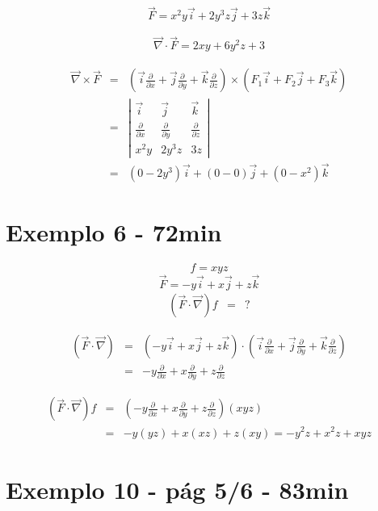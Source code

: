 \documentclass[a4paper,10pt]{article}
\begin{document}
 $$\vec{F}=x^2y\vec{i}+2y^3z\vec{j}+3z\vec{k} $$
 
 \begin{eqnarray*}
  \vec{\nabla}\cdot\vec{F}=2xy+6y^2z+3
 \end{eqnarray*}

  \begin{eqnarray*}
\vec{\nabla}\times\vec{F}&=&\left(\vec{i}\frac{\partial}{\partial x}+\vec{j}\frac{\partial}{\partial y}+\vec{k}\frac{\partial}{\partial z}\right)\times\left(F_1\vec{i}+F_2\vec{j}+F_3\vec{k}\right)\\
&=&\left|
\begin{array}{ccc}
\vec{i}&\vec{j}&\vec{k} \\[.2cm]
\frac{\partial}{\partial x } & \frac{\partial}{\partial y } &\frac{\partial}{\partial z } \\[.2cm]
x^2y&2y^3z&3z
\end{array}
\right|\\
&=&\left(0-2y^3\right)\vec{i}+\left(0-0\right)\vec{j}+\left(0-x^2\right)\vec{k}
 \end{eqnarray*}

 
\section{Exemplo 6 - 72min}
$$f=xyz$$
$$\vec{F}=-y\vec{i}+x\vec{j}+z\vec{k} $$
\begin{eqnarray*}
 (\vec{F}\cdot\vec{\nabla})f&=&?
\end{eqnarray*}

\begin{eqnarray*}
 (\vec{F}\cdot\vec{\nabla})&=&\left(-y\vec{i}+x\vec{j}+z\vec{k}\right)\cdot\left(\vec{i}\frac{\partial}{\partial x}+\vec{j}\frac{\partial}{\partial y}+\vec{k}\frac{\partial}{\partial z}\right)\\
 &=&-y\frac{\partial}{\partial x}+x\frac{\partial}{\partial y} + z \frac{\partial}{\partial z}
\end{eqnarray*}


\begin{eqnarray*}
 (\vec{F}\cdot\vec{\nabla})f&=&\left(-y\frac{\partial}{\partial x}+x\frac{\partial}{\partial y} + z \frac{\partial}{\partial z}\right)(xyz)\\
 &=&-y(yz)+x(xz)+z(xy)=-y^2z+x^2z+xyz
\end{eqnarray*}

\section{Exemplo 10 - pág 5/6 - 83min}
\end{document}

